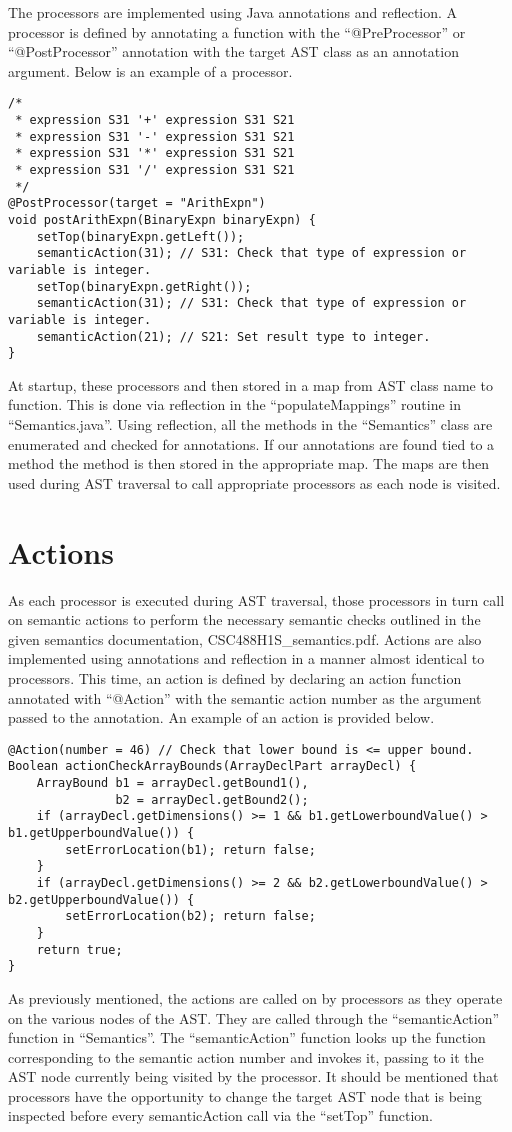 \documentclass[oneside]{amsart}
\theoremstyle{definition}
\theoremstyle{remark}
\numberwithin{equation}{section}
\begin{document}
The processors are implemented using Java annotations and reflection. A processor is defined by 
annotating a function with the ``@PreProcessor'' or ``@PostProcessor'' annotation with the target
AST class as an annotation argument. Below is an example of a processor.
\begin{lstlisting}
/*
 * expression S31 '+' expression S31 S21
 * expression S31 '-' expression S31 S21
 * expression S31 '*' expression S31 S21
 * expression S31 '/' expression S31 S21
 */
@PostProcessor(target = "ArithExpn")
void postArithExpn(BinaryExpn binaryExpn) {
    setTop(binaryExpn.getLeft());
    semanticAction(31); // S31: Check that type of expression or variable is integer.
    setTop(binaryExpn.getRight());
    semanticAction(31); // S31: Check that type of expression or variable is integer.
    semanticAction(21); // S21: Set result type to integer.
}
\end{lstlisting}
At startup, these processors and then stored in a map from AST class name to function. This is done
via reflection in the ``populateMappings'' routine in ``Semantics.java''. Using reflection, all the
methods in the ``Semantics'' class are enumerated and checked for annotations. If our annotations
are found tied to a method the method is then stored in the appropriate map. The maps are then used
during AST traversal to call appropriate processors as each node is visited.

\section{Actions}
As each processor is executed during AST traversal, those processors in turn call on semantic
actions to perform the necessary semantic checks outlined in the given semantics documentation,
CSC488H1S\_semantics.pdf. Actions are also implemented using annotations and reflection in a manner
almost identical to processors. This time, an action is defined by declaring an action function
annotated with ``@Action'' with the semantic action number as the argument passed to the annotation.
An example of an action is provided below.
\begin{lstlisting}
@Action(number = 46) // Check that lower bound is <= upper bound.
Boolean actionCheckArrayBounds(ArrayDeclPart arrayDecl) {
    ArrayBound b1 = arrayDecl.getBound1(),
               b2 = arrayDecl.getBound2();
    if (arrayDecl.getDimensions() >= 1 && b1.getLowerboundValue() > b1.getUpperboundValue()) {
        setErrorLocation(b1); return false;
    }
    if (arrayDecl.getDimensions() >= 2 && b2.getLowerboundValue() > b2.getUpperboundValue()) {
        setErrorLocation(b2); return false;
    }
    return true;
}
\end{lstlisting}
As previously mentioned, the actions are called on by processors as they operate on the various
nodes of the AST. They are called through the ``semanticAction'' function in ``Semantics''.
The ``semanticAction'' function looks up the function corresponding to the semantic action number
and invokes it, passing to it the AST node currently being visited by the processor. It should be
mentioned that processors have the opportunity to change the target AST node that is being inspected
before every semanticAction call via the ``setTop'' function.
\end{document}
